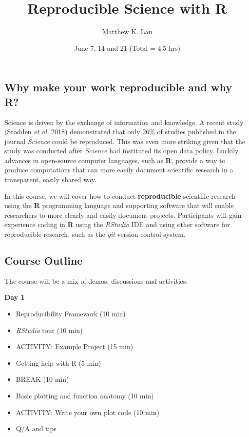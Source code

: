 \documentclass[11pt,]{article}
\title{Reproducible Science with R}
\author{Matthew K. Lau}
\date{June 7, 14 and 21 (Total = 4.5 hrs)}
\providecommand{\tightlist}{%
  \setlength{\itemsep}{0pt}\setlength{\parskip}{0pt}}
\begin{document}
\maketitle

\hypertarget{why-make-your-work-reproducible-and-why-r}{%
\subsection{Why make your work reproducible and why
R?}\label{why-make-your-work-reproducible-and-why-r}}

Science is driven by the exchange of information and knowledge. A recent
study (Stodden \emph{et al.} 2018) demonstrated that only 26\% of
studies published in the journal \emph{Science} could be reproduced.
This was even more striking given that the study was conducted after
\emph{Science} had instituted its open data policy. Luckily, advances in
open-source computer languages, such as \textbf{R}, provide a way to
produce computations that can more easily document scientific research
in a transparent, easily shared way.

In this course, we will cover how to conduct \textbf{reproducible}
scientific research using the \textbf{R} programming language and
supporting software that will enable researchers to more clearly and
easily document projects. Participants will gain experience coding in
\textbf{R} using the \emph{RStudio} IDE and using other software for
reproducible research, such as the \emph{git} version control system.

\hypertarget{course-outline}{%
\subsection{Course Outline}\label{course-outline}}

The course will be a mix of demos, discussions and activities:

\textbf{Day 1}

\begin{itemize}
\tightlist
\item
  Reproducibility Framework (10 min)
\item
  \emph{RStudio} tour (10 min)
\item
  ACTIVITY: Example Project (15 min)
\item
  Getting help with R (5 min)
\item
  BREAK (10 min)
\item
  Basic plotting and function anatomy (10 min)
\item
  ACTIVITY: Write your own plot code (10 min)
\item
  Q/A and tips
\end{itemize}
\end{document}
